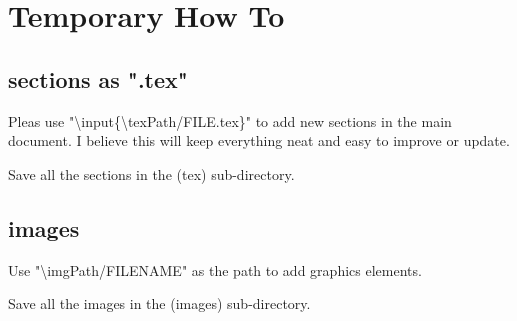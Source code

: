 \section{Temporary How To}

\subsection{sections as ".tex"}
Pleas use "\textbackslash input\{\textbackslash texPath/FILE.tex\}" to add new sections in the main document. I believe this will keep everything neat and easy to improve or update.

Save all the sections in the (tex) sub-directory.

\subsection{images}
Use "\textbackslash imgPath/FILENAME" as the path to add graphics elements.

Save all the images in the (images) sub-directory.